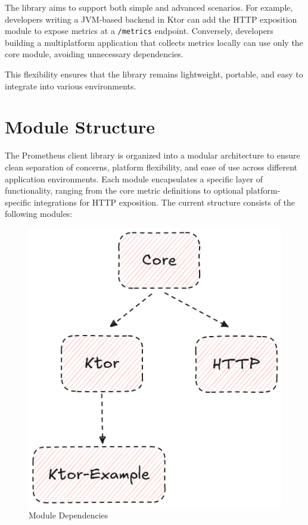 The library aims to support both simple and advanced scenarios.
For example, developers writing a \ac{JVM}-based backend in Ktor can add the HTTP exposition module to expose
metrics at a \texttt{/metrics} endpoint.
Conversely, developers building a multiplatform application that collects metrics locally can use only the core module, avoiding unnecessary dependencies.

This flexibility ensures that the library remains lightweight, portable, and easy to integrate into various environments.


\section{Module Structure}\label{sec:module-structure}

The Prometheus client library is organized into a modular architecture to ensure clean separation of concerns, platform flexibility, and ease of use across different application environments.
Each module encapsulates a specific layer of functionality, ranging from the core metric definitions to optional platform-specific integrations for HTTP exposition.
The current structure consists of the following modules:

\begin{figure}[h]
    \centering
    \includegraphics[width=0.75\linewidth, keepaspectratio]{./figures/module_dependencies.png}
    \caption{Module Dependencies}
\end{figure}

